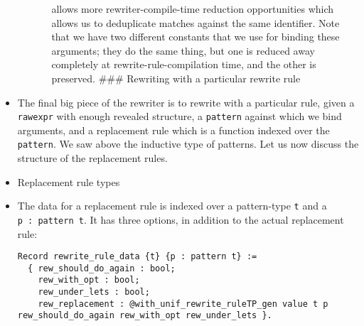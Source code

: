 \begin{itemize}
\begin{itemize}
\begin{itemize}
      allows more rewriter-compile-time reduction opportunities which
      allows us to deduplicate matches against the same identifier. Note
      that we have two different constants that we use for binding these
      arguments; they do the same thing, but one is reduced away
      completely at rewrite-rule-compilation time, and the other is
      preserved. \#\#\# Rewriting with a particular rewrite rule
    \end{itemize}
  \end{itemize}
\item
  The final big piece of the rewriter is to rewrite with a particular
  rule, given a \texttt{rawexpr} with enough revealed structure, a
  \texttt{pattern} against which we bind arguments, and a replacement
  rule which is a function indexed over the \texttt{pattern}. We saw
  above the inductive type of patterns. Let us now discuss the structure
  of the replacement rules.
\item
  Replacement rule types
\item
  The data for a replacement rule is indexed over a pattern-type
  \texttt{t} and a \texttt{p\ :\ pattern\ t}. It has three options, in
  addition to the actual replacement rule:

\begin{verbatim}
Record rewrite_rule_data {t} {p : pattern t} :=
  { rew_should_do_again : bool;
    rew_with_opt : bool;
    rew_under_lets : bool;
    rew_replacement : @with_unif_rewrite_ruleTP_gen value t p rew_should_do_again rew_with_opt rew_under_lets }.
\end{verbatim}


\end{itemize}
